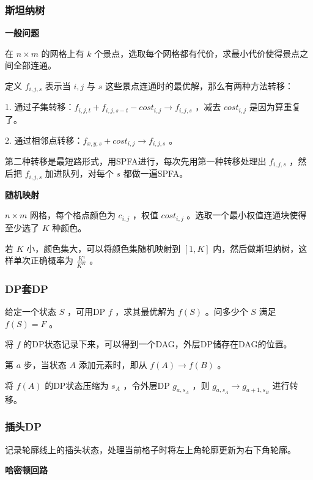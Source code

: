 \subsubsection{斯坦纳树}

\textbf{一般问题}

在 $n\times m$ 的网格上有 $k$ 个景点，选取每个网格都有代价，求最小代价使得景点之间全部连通。

定义 $f_{i,j,s}$ 表示当 $i,j$ 与 $s$ 这些景点连通时的最优解，那么有两种方法转移：

1. 通过子集转移：$f_{i,j,t}+f_{i,j,s-t}-cost_{i,j}\to f_{i,j,s}$ ，减去 $cost_{i,j}$ 是因为算重复了。

2. 通过相邻点转移：$f_{x,y,s}+cost_{i,j}\to f_{i,j,s}$ 。

第二种转移是最短路形式，用SPFA进行，每次先用第一种转移处理出 $f_{i,j,s}$ ，然后把 $f_{i,j,s}$ 加进队列，对每个 $s$ 都做一遍SPFA。



\textbf{随机映射}

$n\times m$ 网格，每个格点颜色为 $c_{i,j}$ ，权值 $cost_{i,j}$ 。选取一个最小权值连通块使得至少选了 $K$ 种颜色。

若 $K$ 小，颜色集大，可以将颜色集随机映射到 $[1,K]$ 内，然后做斯坦纳树，这样单次正确概率为 $\frac{K!}{K^K}$ 。

\subsubsection{DP套DP}

给定一个状态 $S$ ，可用DP $f$ ，求其最优解为 $f(S)$ 。问多少个 $S$ 满足 $f(S)=F$ 。

将 $f$ 的DP状态记录下来，可以得到一个DAG，外层DP储存在DAG的位置。

第 $a$ 步，当状态 $A$ 添加元素时，即从 $f(A)\to f(B)$ 。

将 $f(A)$ 的DP状态压缩为 $s_A$ ，令外层DP $g_{a,s_A}$ ，则 $g_{a,s_A}\to g_{a+1,s_B}$ 进行转移。

\newpage

\subsubsection{插头DP}

记录轮廓线上的插头状态，处理当前格子时将左上角轮廓更新为右下角轮廓。

\vspace{0.3cm}

\textbf{哈密顿回路}

